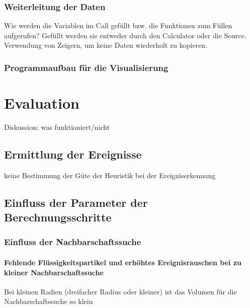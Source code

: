 \subsection{Weiterleitung der Daten}

Wie werden die Variablen im Call gefüllt bzw. die Funktionen zum Füllen aufgerufen? Gefüllt werden sie entweder durch den Calculator oder die Source. Verwendung von Zeigern, um keine Daten wiederholt zu kopieren.

\subsection{Programmaufbau für die Visualisierung}


\chapter{Evaluation}

Diskussion: was funktioniert/nicht

\section{Ermittlung der Ereignisse}

keine Bestimmung der Güte der Heuristik bei der Ereigniserkennung


\section{Einfluss der Parameter der Berechnungsschritte}

\subsection{Einfluss der Nachbarschaftssuche}\label{sec:eva:nachbarschaftssuche}

\subsubsection{Fehlende Flüssigkeitspartikel und erhöhtes Ereignisrauschen bei zu kleiner Nachbarschaftssuche}

Bei kleinen Radien (dreifacher Radius oder kleiner) ist das Volumen für die Nachbarschaftssuche so klein %

